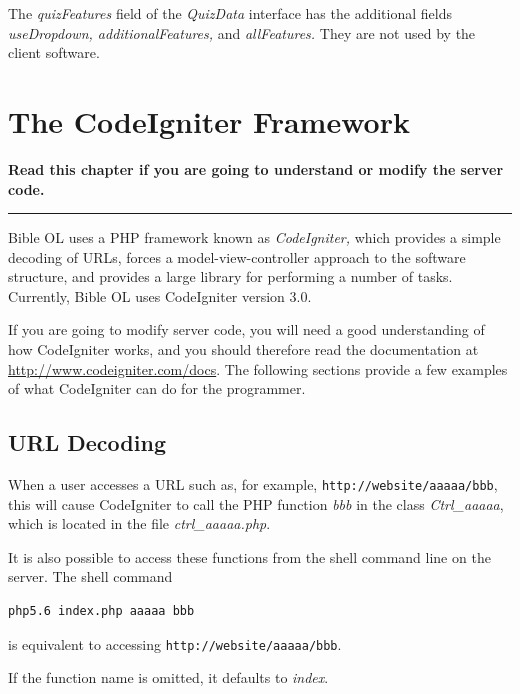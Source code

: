 \documentclass[11pt,oneside,a4paper]{memoir}
\begin{document}
The \emph{quizFeatures} field of the \emph{QuizData} interface has the additional fields
\emph{useDropdown, additionalFeatures,} and \emph{allFeatures.} They are not used by the client
software.


\chapter{The CodeIgniter Framework}\label{chap-codeigniter-use}

\textbf{Read this chapter if you are going to understand or modify the server code.}
\plainbreak{3}

Bible OL uses a PHP framework known as \emph{CodeIgniter,} which provides a simple
decoding of URLs, forces a model-view-controller approach to the software structure, and provides a
large library for performing a number of tasks. Currently, Bible OL uses CodeIgniter version 3.0.

If you are going to modify server code, you will need a good understanding of how
CodeIgniter works, and you should therefore read the documentation at
\url{http://www.codeigniter.com/docs}. The following sections provide a few examples of what
CodeIgniter can do for the programmer.

\section{URL Decoding}\label{url-decoding}

When a user accesses a URL such as, for example, \texttt{http://website/aaaaa/bbb}, this will cause
CodeIgniter to call the PHP function \emph{bbb} in the class \emph{Ctrl\_aaaaa}, which is located in
the file \emph{ctrl\_aaaaa.php}.

It is also possible to access these functions from the shell command line on the server. The shell command

\begin{lstlisting}[language=bash]
php5.6 index.php aaaaa bbb
\end{lstlisting}

\noindent
is equivalent to accessing \texttt{http://website/aaaaa/bbb}.

If the function name is omitted, it defaults to \emph{index}.
\end{document}
